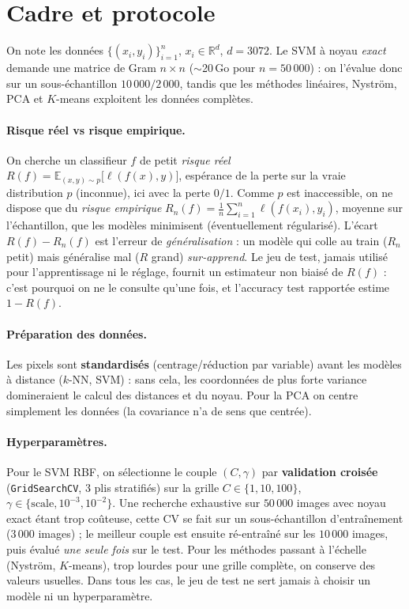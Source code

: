 \documentclass[11pt]{article}
\theoremstyle{remark}
\newcommand{\R}{\mathbb{R}}
\begin{document}
\section{Cadre et protocole}
On note les données $\{(x_i,y_i)\}_{i=1}^n$, $x_i\in\R^{d}$, $d=3072$. Le SVM à
noyau \emph{exact} demande une matrice de Gram $n\times n$ ($\sim$20\,Go pour
$n=50\,000$) : on l'évalue donc sur un sous-échantillon $10\,000/2\,000$, tandis que
les méthodes linéaires, Nyström, PCA et $K$-means exploitent les données complètes.

\paragraph{Risque réel vs risque empirique.} On cherche un classifieur $f$ de petit
\emph{risque réel} $R(f)=\mathbb E_{(x,y)\sim p}\big[\ell(f(x),y)\big]$, espérance de
la perte sur la vraie distribution $p$ (inconnue), ici avec la perte $0/1$. Comme
$p$ est inaccessible, on ne dispose que du \emph{risque empirique}
$R_n(f)=\tfrac1n\sum_{i=1}^n \ell(f(x_i),y_i)$, moyenne sur l'échantillon, que les
modèles minimisent (éventuellement régularisé). L'écart $R(f)-R_n(f)$ est l'erreur
de \emph{généralisation} : un modèle qui colle au train ($R_n$ petit) mais
généralise mal ($R$ grand) \emph{sur-apprend}. Le jeu de test, jamais utilisé pour
l'apprentissage ni le réglage, fournit un estimateur non biaisé de $R(f)$ : c'est
pourquoi on ne le consulte qu'une fois, et l'accuracy test rapportée estime $1-R(f)$.

\paragraph{Préparation des données.} Les pixels sont \textbf{standardisés}
(centrage/réduction par variable) avant les modèles à distance ($k$-NN, SVM) : sans
cela, les coordonnées de plus forte variance domineraient le calcul des distances et
du noyau. Pour la PCA on centre simplement les données (la covariance n'a de sens
que centrée).

\paragraph{Hyperparamètres.} Pour le SVM RBF, on sélectionne le couple
$(C,\gamma)$ par \textbf{validation croisée} (\texttt{GridSearchCV}, $3$ plis
stratifiés) sur la grille $C\in\{1,10,100\}$, $\gamma\in\{\text{scale},10^{-3},
10^{-2}\}$. Une recherche exhaustive sur $50\,000$ images avec noyau exact étant
trop coûteuse, cette CV se fait sur un sous-échantillon d'entraînement
($3\,000$ images) ; le meilleur couple est ensuite ré-entraîné sur les $10\,000$
images, puis évalué \emph{une seule fois} sur le test. Pour les méthodes passant à
l'échelle (Nyström, $K$-means), trop lourdes pour une grille complète, on conserve
des valeurs usuelles. Dans tous les cas, le jeu de test ne sert jamais à choisir un
modèle ni un hyperparamètre.
\end{document}

